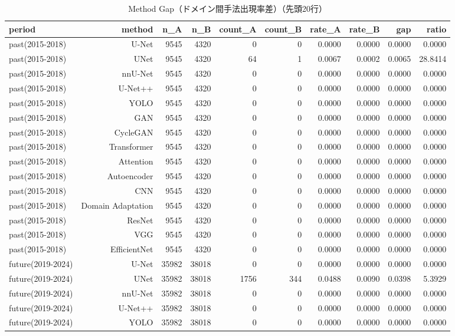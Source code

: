 \begin{table}[htbp]
  \centering
  \caption{Method Gap（ドメイン間手法出現率差）（先頭20行）}
  \label{tab:method_gap}
  \begin{tabular}{lrrrrrrrrr}
    \hline
    period & method & n\_A & n\_B & count\_A & count\_B & rate\_A & rate\_B & gap & ratio \\
    \hline
    past(2015-2018) & U-Net & 9545 & 4320 & 0 & 0 & 0.0000 & 0.0000 & 0.0000 & 0.0000 \\
    past(2015-2018) & UNet & 9545 & 4320 & 64 & 1 & 0.0067 & 0.0002 & 0.0065 & 28.8414 \\
    past(2015-2018) & nnU-Net & 9545 & 4320 & 0 & 0 & 0.0000 & 0.0000 & 0.0000 & 0.0000 \\
    past(2015-2018) & U-Net++ & 9545 & 4320 & 0 & 0 & 0.0000 & 0.0000 & 0.0000 & 0.0000 \\
    past(2015-2018) & YOLO & 9545 & 4320 & 0 & 0 & 0.0000 & 0.0000 & 0.0000 & 0.0000 \\
    past(2015-2018) & GAN & 9545 & 4320 & 0 & 0 & 0.0000 & 0.0000 & 0.0000 & 0.0000 \\
    past(2015-2018) & CycleGAN & 9545 & 4320 & 0 & 0 & 0.0000 & 0.0000 & 0.0000 & 0.0000 \\
    past(2015-2018) & Transformer & 9545 & 4320 & 0 & 0 & 0.0000 & 0.0000 & 0.0000 & 0.0000 \\
    past(2015-2018) & Attention & 9545 & 4320 & 0 & 0 & 0.0000 & 0.0000 & 0.0000 & 0.0000 \\
    past(2015-2018) & Autoencoder & 9545 & 4320 & 0 & 0 & 0.0000 & 0.0000 & 0.0000 & 0.0000 \\
    past(2015-2018) & CNN & 9545 & 4320 & 0 & 0 & 0.0000 & 0.0000 & 0.0000 & 0.0000 \\
    past(2015-2018) & Domain Adaptation & 9545 & 4320 & 0 & 0 & 0.0000 & 0.0000 & 0.0000 & 0.0000 \\
    past(2015-2018) & ResNet & 9545 & 4320 & 0 & 0 & 0.0000 & 0.0000 & 0.0000 & 0.0000 \\
    past(2015-2018) & VGG & 9545 & 4320 & 0 & 0 & 0.0000 & 0.0000 & 0.0000 & 0.0000 \\
    past(2015-2018) & EfficientNet & 9545 & 4320 & 0 & 0 & 0.0000 & 0.0000 & 0.0000 & 0.0000 \\
    future(2019-2024) & U-Net & 35982 & 38018 & 0 & 0 & 0.0000 & 0.0000 & 0.0000 & 0.0000 \\
    future(2019-2024) & UNet & 35982 & 38018 & 1756 & 344 & 0.0488 & 0.0090 & 0.0398 & 5.3929 \\
    future(2019-2024) & nnU-Net & 35982 & 38018 & 0 & 0 & 0.0000 & 0.0000 & 0.0000 & 0.0000 \\
    future(2019-2024) & U-Net++ & 35982 & 38018 & 0 & 0 & 0.0000 & 0.0000 & 0.0000 & 0.0000 \\
    future(2019-2024) & YOLO & 35982 & 38018 & 0 & 0 & 0.0000 & 0.0000 & 0.0000 & 0.0000 \\
    \hline
  \end{tabular}
\end{table}